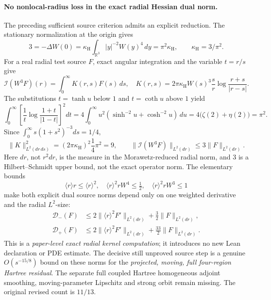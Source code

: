 \documentclass[11pt]{amsart}
\begin{document}
\paragraph{No nonlocal-radius loss in the exact radial Hessian dual norm.}
The preceding sufficient source criterion admits an explicit reduction.
The stationary normalization at the origin gives
\[
3=-\Delta W(0)=\kappa_{\mathrm H}
  \int_{\mathbb R^3}|y|^{-2}W(y)^4\,dy
 =\pi^2\kappa_{\mathrm H},
 \qquad \kappa_{\mathrm H}=3/\pi^2.
\]
For a real radial test source \(F\), exact angular integration
and the variable \(t=r/s\) give
\[
\mathcal I(W^3F)(r)
 =\int_0^\infty K(r,s)F(s)\,ds,\quad
K(r,s)=2\pi\kappa_{\mathrm H}W(s)^3
    \frac{s}{r}\log\frac{r+s}{|r-s|}.
\]
The substitutions \(t=\tanh u\) below \(1\) and
\(t=\coth u\) above \(1\) yield
\[
\int_0^\infty\left[\frac1t
  \log\frac{1+t}{|1-t|}\right]^2dt
 =4\int_0^\infty u^2
   (\sinh^{-2}u+\cosh^{-2}u)\,du
 =4\bigl(\zeta(2)+\eta(2)\bigr)=\pi^2.
\]
Since \(\int_0^\infty s(1+s^2)^{-3}ds=1/4\),
\[
\|K\|_{L^2(dr\,ds)}^2
 =(2\pi\kappa_{\mathrm H})^2
   \frac14\pi^2=9,\qquad
\|\mathcal I(W^3F)\|_{L^2(dr)}
 \le3\|F\|_{L^2(dr)}.
\]
Here \(dr\), not \(r^2dr\), is the measure in the
Morawetz-reduced radial norm, and \(3\) is a Hilbert--Schmidt
upper bound, not the exact operator norm.
The elementary bounds
\[
\langle r\rangle r\le\langle r\rangle^2,\quad
\langle r\rangle^2rW^4\le\tfrac12,\quad
\langle r\rangle^2rW^3\le1
\]
make both explicit dual source norms depend only on one
weighted derivative and the radial \(L^2\)-size:
\[
\begin{aligned}
\mathcal D_-(F)&\le
 2\|\langle r\rangle^2F'\|_{L^2(dr)}
   +\tfrac32\|F\|_{L^2(dr)},\\
\mathcal D_+(F)&\le
 2\|\langle r\rangle^2F'\|_{L^2(dr)}
   +\tfrac{33}2\|F\|_{L^2(dr)}.
\end{aligned}
\]
This is a \emph{paper-level exact radial kernel computation};
it introduces no new Lean declaration or PDE estimate.
The decisive still unproved source step is a genuine
\(O(s^{-15/8})\) bound on these norms for the
\emph{projected, moving, full four-region Hartree residual}.
The separate full coupled Hartree homogeneous adjoint smoothing,
moving-parameter Lipschitz and strong orbit remain missing.
The original revised count is \(11/13\).
\end{document}
